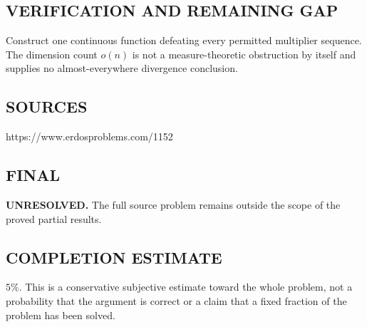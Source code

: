 \subsection*{VERIFICATION AND REMAINING GAP}
Construct one continuous function defeating every permitted multiplier
sequence. The dimension count $o(n)$ is not a measure-theoretic obstruction by
itself and supplies no almost-everywhere divergence conclusion.

\subsection*{SOURCES}
https://www.erdosproblems.com/1152

\subsection*{FINAL}
\textbf{UNRESOLVED.} The full source problem remains outside the scope of the proved partial results.

\subsection*{COMPLETION ESTIMATE}
$5\%$. This is a conservative subjective estimate toward the whole problem, not a probability that the argument is correct or a claim that a fixed fraction of the problem has been solved.
